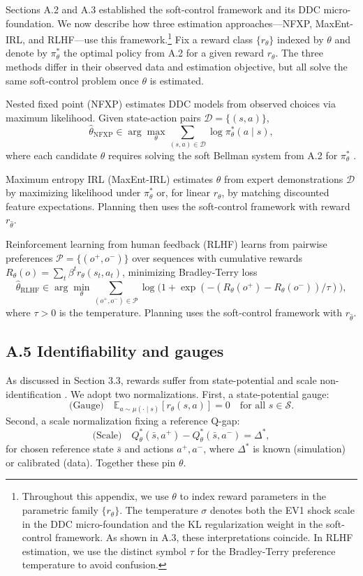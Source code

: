 Sections A.2 and A.3 established the soft-control framework and its DDC micro-foundation. We now describe how three estimation approaches---NFXP, MaxEnt-IRL, and RLHF---use this framework.\footnote{\footnotesize Throughout this appendix, we use $\theta$ to index reward parameters in the parametric family $\{r_\theta\}$. The temperature $\sigma$ denotes both the EV1 shock scale in the DDC micro-foundation and the KL regularization weight in the soft-control framework. As shown in A.3, these interpretations coincide. In RLHF estimation, we use the distinct symbol $\tau$ for the Bradley-Terry preference temperature to avoid confusion.} Fix a reward class $\{r_\theta\}$ indexed by $\theta$ and denote by $\pi^{\ast}_\theta$ the optimal policy from A.2 for a given reward $r_\theta$. The three methods differ in their observed data and estimation objective, but all solve the same soft-control problem once $\theta$ is estimated.

Nested fixed point (NFXP) estimates DDC models from observed choices via maximum likelihood. Given state-action pairs $\mathcal D=\{(s,a)\}$,
\[
\hat\theta_{\text{NFXP}}
\in\arg\max_\theta \sum_{(s,a)\in\mathcal D} \log \pi^{\ast}_\theta(a\mid s),
\]
where each candidate $\theta$ requires solving the soft Bellman system from A.2 for $\pi^{\ast}_\theta$ \citep{rust:1987,rust:1988}.

Maximum entropy IRL (MaxEnt-IRL) estimates $\theta$ from expert demonstrations $\mathcal D$ by maximizing likelihood under $\pi^{\ast}_\theta$ or, for linear $r_\theta$, by matching discounted feature expectations. Planning then uses the soft-control framework with reward $r_{\hat\theta}$.

Reinforcement learning from human feedback (RLHF) learns from pairwise preferences $\mathcal P=\{(o^+,o^-)\}$ over sequences with cumulative rewards $R_\theta(o)=\sum_t \beta^t r_\theta(s_t,a_t)$, minimizing Bradley-Terry loss
\[
\hat\theta_{\text{RLHF}}\in\arg\min_\theta \sum_{(o^+,o^-)\in\mathcal P} \log\!\Big(1+\exp(-(R_\theta(o^+)-R_\theta(o^-))/\tau)\Big),
\]
where $\tau>0$ is the temperature. Planning uses the soft-control framework with $r_{\hat\theta}$.

\subsection*{A.5 Identifiability and gauges}
As discussed in Section 3.3, rewards suffer from state-potential and scale non-identification \citep{nhr:1999,ng:2000}. We adopt two normalizations. First, a state-potential gauge:
\[
\text{(Gauge)}\quad \mathbb E_{a\sim\mu(\cdot\mid s)}[r_\theta(s,a)]=0\quad \text{for all }s\in\mathcal S.
\]
Second, a scale normalization fixing a reference Q-gap:
\[
\text{(Scale)}\quad Q^{\ast}_\theta(\bar s,a^+)-Q^{\ast}_\theta(\bar s,a^-)=\Delta^{\ast},
\]
for chosen reference state $\bar s$ and actions $a^+,a^-$, where $\Delta^{\ast}$ is known (simulation) or calibrated (data). Together these pin $\theta$.

